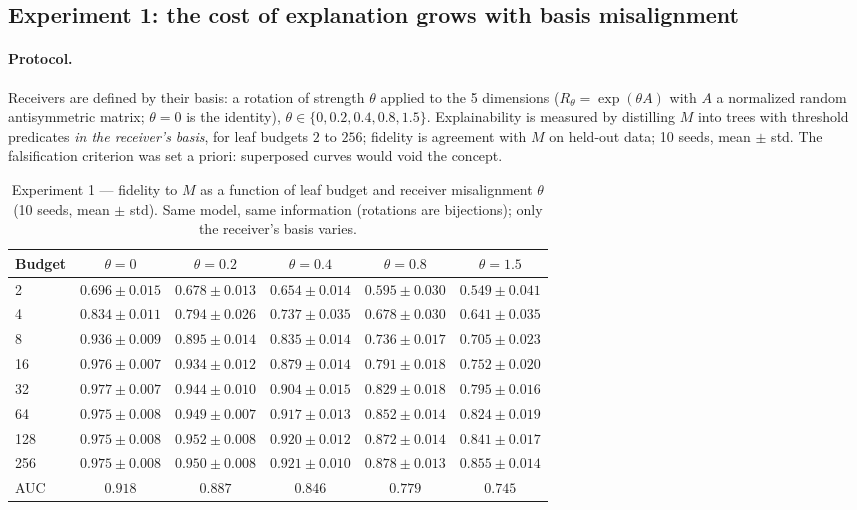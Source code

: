 \documentclass[10pt]{article}
\theoremstyle{definition}
\theoremstyle{plain}
\begin{document}
\subsection{Experiment 1: the cost of explanation grows with basis misalignment}
\label{sec:exp1}

\paragraph{Protocol.} Receivers are defined by their basis: a rotation of strength $\theta$ applied to the 5 dimensions ($R_\theta = \exp(\theta A)$ with $A$ a normalized random antisymmetric matrix; $\theta = 0$ is the identity), $\theta \in \{0, 0.2, 0.4, 0.8, 1.5\}$. Explainability is measured by distilling $M$ into trees with threshold predicates \emph{in the receiver's basis}, for leaf budgets $2$ to $256$; fidelity is agreement with $M$ on held-out data; 10 seeds, mean $\pm$ std. The falsification criterion was set a priori: superposed curves would void the concept.

\begin{table}[t]
\centering
\footnotesize
\caption{Experiment 1 --- fidelity to $M$ as a function of leaf budget and receiver misalignment $\theta$ (10 seeds, mean $\pm$ std). Same model, same information (rotations are bijections); only the receiver's basis varies.}
\label{tab:exp1}
\begin{tabular}{lccccc}
\toprule
Budget & $\theta{=}0$ & $\theta{=}0.2$ & $\theta{=}0.4$ & $\theta{=}0.8$ & $\theta{=}1.5$ \\
\midrule
2   & $0.696{\pm}0.015$ & $0.678{\pm}0.013$ & $0.654{\pm}0.014$ & $0.595{\pm}0.030$ & $0.549{\pm}0.041$ \\
4   & $0.834{\pm}0.011$ & $0.794{\pm}0.026$ & $0.737{\pm}0.035$ & $0.678{\pm}0.030$ & $0.641{\pm}0.035$ \\
8   & $0.936{\pm}0.009$ & $0.895{\pm}0.014$ & $0.835{\pm}0.014$ & $0.736{\pm}0.017$ & $0.705{\pm}0.023$ \\
16  & $0.976{\pm}0.007$ & $0.934{\pm}0.012$ & $0.879{\pm}0.014$ & $0.791{\pm}0.018$ & $0.752{\pm}0.020$ \\
32  & $0.977{\pm}0.007$ & $0.944{\pm}0.010$ & $0.904{\pm}0.015$ & $0.829{\pm}0.018$ & $0.795{\pm}0.016$ \\
64  & $0.975{\pm}0.008$ & $0.949{\pm}0.007$ & $0.917{\pm}0.013$ & $0.852{\pm}0.014$ & $0.824{\pm}0.019$ \\
128 & $0.975{\pm}0.008$ & $0.952{\pm}0.008$ & $0.920{\pm}0.012$ & $0.872{\pm}0.014$ & $0.841{\pm}0.017$ \\
256 & $0.975{\pm}0.008$ & $0.950{\pm}0.008$ & $0.921{\pm}0.010$ & $0.878{\pm}0.013$ & $0.855{\pm}0.014$ \\
\midrule
AUC & $\mathbf{0.918}$ & $0.887$ & $0.846$ & $0.779$ & $\mathbf{0.745}$ \\
\bottomrule
\end{tabular}
\end{table}
\end{document}
